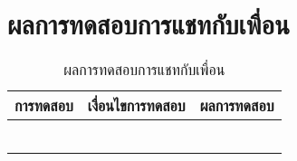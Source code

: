 \section{ผลการทดสอบการแชทกับเพื่อน}
\begin{table}[H]
	\caption{ผลการทดสอบการแชทกับเพื่อน}
    \centering	
	\label{tab:test15}
    \begin{tabular}{ | p{4cm} | p{4cm} | p{4cm} |  }
		\hline
	\multicolumn{1}{|c|}{การทดสอบ} & \multicolumn{1}{c|}{เงื่อนไขการทดสอบ} & \multicolumn{1}{c|}{ผลการทดสอบ} \\ \hline
	\setstretch{1.0}{ทดสอบการแชทกับเพื่อน}
	& \setstretch{1.0}{ผู้ใช้ไม่กรอกข้อความ และกดส่งข้อความ}
	& \setstretch{1.0}{ระบบจะไม่ส่งข้อความ} \\ \cline{2-3} 
	& \setstretch{1.0}{ผู้ใช้กรอกข้อความ และส่งข้อความ}
	& \setstretch{1.0}{ระบบจะส่งข้อความ } \\ \cline{2-3} 
	& \setstretch{1.0}{ผู้ใช้เลือกรูปและกรอกข้อความ จากนั้นส่งข้อความ}
	& \setstretch{1.0}{ระบบจะส่งรูปและข้อความ และแสดงรูปและข้อความ } \\ \cline{2-3} 
	& \setstretch{1.0}{ผู้ใช้เลือกรูปและไม่กรอกข้อความ จากนั้นส่งข้อความ}
	& \setstretch{1.0}{ระบบจะส่งรูป และแสดงรูป } \\ \cline{2-3} 
	& \setstretch{1.0}{ผู้ใช้เลือกปุ่มลบข้อความ}
	& \setstretch{1.0}{ระบบจะลบข้อความ } \\ \cline{2-3} 
	& \setstretch{1.0}{ผู้ใช้เลือกปุ่มลบข้อความทั้งหมด}
	& \setstretch{1.0}{ระบบจะลบข้อความทั้งหมดระหว่างผู้ใช้งาน } \\ \hline
    \end{tabular}
\end{table}

